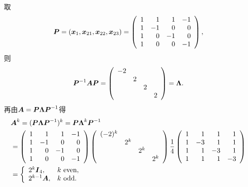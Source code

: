 \begin{frame}
\begin{jie}
  取
  $$
  \boldsymbol{P}=({\boldsymbol{x}}_1,{\boldsymbol{x}}_{21},{\boldsymbol{x}}_{22},{\boldsymbol{x}}_{23})=
  \left(
    \begin{array}{rrrr}
      1& 1& 1&-1\\
      1&-1& 0& 0\\
      1& 0&-1& 0\\
      1& 0& 0&-1
    \end{array}
  \right),
  $$
  则
  $$
  \boldsymbol{P}^{-1}\boldsymbol{A}\boldsymbol{P}=\left(
    \begin{array}{rrrr}
      -2&&&\\
        &2&&\\
        &&2\\
        &&&2
    \end{array}
  \right)=\boldsymbol{\Lambda}.
  $$
  再由$\boldsymbol{A}=\boldsymbol{P}\boldsymbol{\Lambda}\boldsymbol{P}^{-1}$得
  $$
  \begin{aligned}
    &\boldsymbol{A}^k=(\boldsymbol{P}\boldsymbol{\Lambda}\boldsymbol{P}^{-1})^k=\boldsymbol{P}\boldsymbol{\Lambda}^k\boldsymbol{P}^{-1}\\
    &=\left(
    \begin{array}{rrrr}
      1& 1& 1&-1\\
      1&-1& 0& 0\\
      1& 0&-1& 0\\
      1& 0& 0&-1
    \end{array}
  \right)
  \left(
    \begin{array}{rrrr}
      (-2)^k&&&\\
        &2^k&&\\
        &&2^k\\
        &&&2^k
    \end{array}
  \right)
  \frac14
  \left(
    \begin{array}{rrrr}
      1& 1& 1& 1\\
      1&-3& 1& 1\\
      1& 1&-3& 1\\
      1& 1& 1&-3
    \end{array}
  \right)\\
  &=\left\{
    \begin{array}{ll}
      2^k \boldsymbol{I}_4, & k\mbox{ even}, \\
      2^{k-1} \boldsymbol{A}, & k\mbox{ odd}.
    \end{array}
  \right.
  \end{aligned}
  $$
\end{jie}

\end{frame}

